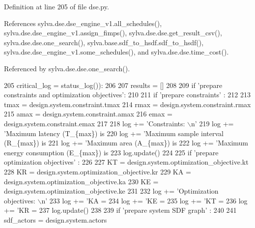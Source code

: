 Definition at line 205 of file dse.\+py.



References sylva.\+dse.\+dse\+\_\+engine\+\_\+v1.\+all\+\_\+schedules(), sylva.\+dse.\+dse\+\_\+engine\+\_\+v1.\+assign\+\_\+fimps(), sylva.\+dse.\+dse.\+get\+\_\+result\+\_\+csv(), sylva.\+dse.\+dse.\+one\+\_\+search(), sylva.\+base.\+sdf\+\_\+to\+\_\+hsdf.\+sdf\+\_\+to\+\_\+hsdf(), sylva.\+dse.\+dse\+\_\+engine\+\_\+v1.\+some\+\_\+schedules(), and sylva.\+dse.\+dse.\+time\+\_\+cost().



Referenced by sylva.\+dse.\+dse.\+one\+\_\+search().


\begin{DoxyCode}
205   critical\_log = status\_log()):
206 
207   results = []
208 
209   \textcolor{keywordflow}{if} \textcolor{stringliteral}{'prepare constraints and optimization objectives'}:
210 
211     \textcolor{keywordflow}{if} \textcolor{stringliteral}{'prepare constraints'} :
212 
213       tmax = design.system.constraint.tmax
214       rmax = design.system.constraint.rmax
215       amax = design.system.constraint.amax
216       emax = design.system.constraint.emax
217 
218       log += \textcolor{stringliteral}{'Constraints: \(\backslash\)n'}
219       log += \textcolor{stringliteral}{'Maximum latency (T\_\{max\}) is %
220       log += \textcolor{stringliteral}{'Maximum sample interval (R\_\{max\}) is %
221       log += \textcolor{stringliteral}{'Maximum area (A\_\{max\}) is %
222       log += \textcolor{stringliteral}{'Maximum energy consumption (E\_\{max\}) is %
223       log.update()
224 
225     \textcolor{keywordflow}{if} \textcolor{stringliteral}{'prepare optimization objectives'} :
226 
227       KT = design.system.optimization\_objective.kt
228       KR = design.system.optimization\_objective.kr
229       KA = design.system.optimization\_objective.ka
230       KE = design.system.optimization\_objective.ke
231 
232       log += \textcolor{stringliteral}{'Optimization objectives: \(\backslash\)n'}
233       log += \textcolor{stringliteral}{'KA = %
234       log += \textcolor{stringliteral}{'KE = %
235       log += \textcolor{stringliteral}{'KT = %
236       log += \textcolor{stringliteral}{'KR = %
237       log.update()
238 
239   \textcolor{keywordflow}{if} \textcolor{stringliteral}{'prepare system SDF graph'} :
240 
241     sdf\_actors = design.system.actors
}}}}}}}}
\end{DoxyCode}
